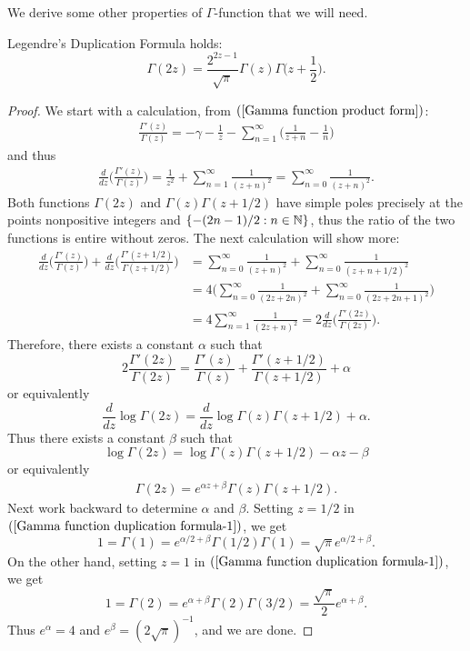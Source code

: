 We derive some other properties of $\Gamma$-function that we will need.
\begin{theorem}
Legendre's Duplication Formula holds:
\[\Gamma(2z)=\frac{2^{2z-1}}{\sqrt{\pi}}\Gamma(z)\Gamma\Big(z+\frac{1}{2}\Big).\]
\end{theorem}
\begin{proof}
We start with a calculation, from $(\ref{Gamma function product form})$:
\begin{align*}
\frac{\Gamma'(z)}{\Gamma(z)}=-\gamma-\frac{1}{z}-\sum_{n=1}^{\infty}\Big(\frac{1}{z+n}-\frac{1}{n}\Big)
\end{align*}
and thus
\begin{align}\label{log Gamma sum expression}
\frac{d}{dz}\Big(\frac{\Gamma'(z)}{\Gamma(z)}\Big)=\frac{1}{z^2}+\sum_{n=1}^{\infty}\frac{1}{(z+n)^2}=\sum_{n=0}^{\infty}\frac{1}{(z+n)^2}.
\end{align}
Both functions $\Gamma(2z)$ and $\Gamma(z)\Gamma(z+1/2)$ have simple poles precisely at the points nonpositive integers and $\{-(2n-1)/2:n\in\mathbb{N}\}$, thus the ratio of the two functions is entire without zeros. The next calculation will show more:
\begin{align*}
\frac{d}{dz}\Big(\frac{\Gamma'(z)}{\Gamma(z)}\Big)+\frac{d}{dz}\Big(\frac{\Gamma'(z+1/2)}{\Gamma(z+1/2)}\Big)&=\sum_{n=0}^{\infty}\frac{1}{(z+n)^2}+\sum_{n=0}^{\infty}\frac{1}{(z+n+1/2)^2}\\
&=4\Big(\sum_{n=0}^{\infty}\frac{1}{(2z+2n)^2}+\sum_{n=0}^{\infty}\frac{1}{(2z+2n+1)^2}\Big)\\
&=4\sum_{n=1}^{\infty}\frac{1}{(2z+n)^2}=2\frac{d}{dz}\Big(\frac{\Gamma'(2z)}{\Gamma(2z)}\Big).
\end{align*}
Therefore, there exists a constant $\alpha$ such that
\[2\frac{\Gamma'(2z)}{\Gamma(2z)}=\frac{\Gamma'(z)}{\Gamma(z)}+\frac{\Gamma'(z+1/2)}{\Gamma(z+1/2)}+\alpha\]
or equivalently
\[\frac{d}{dz}\log\Gamma(2z)=\frac{d}{dz}\log\Gamma(z)\Gamma(z+1/2)+\alpha.\]
Thus there exists a constant $\beta$ such that
\[\log\Gamma(2z)=\log\Gamma(z)\Gamma(z+1/2)-\alpha z-\beta\]
or equivalently
\begin{align}\label{Gamma function duplication formula-1}
\Gamma(2z)=e^{\alpha z+\beta}\Gamma(z)\Gamma(z+1/2).
\end{align}
Next work backward to determine $\alpha$ and $\beta$. Setting $z=1/2$ in $(\ref{Gamma function duplication formula-1})$, we get
\[1=\Gamma(1)=e^{\alpha/2+\beta}\Gamma(1/2)\Gamma(1)=\sqrt{\pi}e^{\alpha/2+\beta}.\]
On the other hand, setting $z=1$ in $(\ref{Gamma function duplication formula-1})$, we get
\[1=\Gamma(2)=e^{\alpha+\beta}\Gamma(2)\Gamma(3/2)=\frac{\sqrt{\pi}}{2}e^{\alpha+\beta}.\]
Thus $e^{\alpha}=4$ and $e^{\beta}=(2\sqrt{\pi})^{-1}$, and we are done.
\end{proof}
